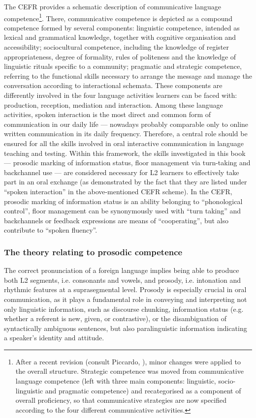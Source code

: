 The CEFR provides a schematic description of communicative language competence\footnote{After a recent revision (consult Piccardo, \citealt{GoodierNorth2018}), minor changes were applied to the overall structure. Strategic competence was moved from communicative language competence (left with three main components: linguistic, socio-linguistic and pragmatic competence) and recategorised as a component of overall proficiency, so that communicative strategies are now specified according to the four different communicative activities.}\citep{FiguerasEtAl2009}. There, communicative competence is depicted as a compound competence formed by several components: linguistic competence, intended as lexical and grammatical knowledge, together with cognitive organisation and accessibility; sociocultural competence, including the knowledge of register appropriateness, degree of formality, rules of politeness and the knowledge of linguistic rituals specific to a community; pragmatic and strategic competence, referring to the functional skills necessary to arrange the message and manage the conversation according to interactional schemata. These components are differently involved in the four language activities learners can be faced with: production, reception, mediation and interaction. Among these language activities, spoken interaction is the most direct and common form of communication in our daily life — nowadays probably comparable only to online written communication in its daily frequency. Therefore, a central role should be ensured for all the skills involved in oral interactive communication in language teaching and testing. Within this framework, the skills investigated in this book — prosodic marking of information status, floor management via turn-taking and backchannel use — are considered necessary for L2 learners to effectively take part in an oral exchange (as demonstrated by the fact that they are listed under “spoken interaction” in the above-mentioned CEFR scheme). In the CEFR, prosodic marking of information status is an ability belonging to “phonological control”, floor management can be synonymously used with “turn taking” and backchannels or feedback expressions are means of “cooperating”, but also contribute to “spoken fluency”.

\subsubsection{The theory relating to prosodic competence}
\hypertarget{Toc191305874}{}
The correct pronunciation of a foreign language implies being able to produce both L2 segments, i.e. consonants and vowels, and prosody, i.e. intonation and rhythmic features at a suprasegmental level. Prosody is especially crucial in oral communication, as it plays a fundamental role in conveying and interpreting not only linguistic information, such as discourse chunking, information status (e.g. whether a referent is new, given, or contrastive), or the disambiguation of syntactically ambiguous sentences, but also paralinguistic information indicating a speaker’s identity and attitude.

